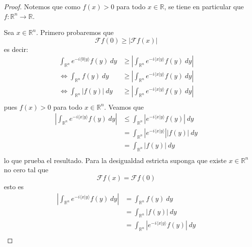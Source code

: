 \documentclass[12pt]{report}
\theoremstyle{largebreak}
\renewcommand{\leq}{\ensuremath{\leqslant}}
\renewcommand{\geq}{\ensuremath{\geqslant}}
\newcommand\abs[1]{\ensuremath{\left|#1\right|}}
\newcommand\cf[3]{\ensuremath{#1:#2\rightarrow#3}}
\newcommand\pint[2]{\ensuremath{\langle#1| #2\rangle}}
\newcommand{\fou}[1]{\ensuremath{\mathcal{F}#1}}
\begin{document}
    \begin{proof}
        Notemos que como $f(x)>0$ para todo $x\in\mathbb{R}$, se tiene en particular que $\cf{f}{\mathbb{R}^n}{\mathbb{R}}$.

        Sea $x\in\mathbb{R}^n$. Primero probaremos que
        \begin{equation*}
            \fou{f}(0)\geq\abs{\fou{f}(x)}
        \end{equation*}
        es decir:
        \begin{equation*}
            \begin{split}
                \int_{\mathbb{R}^n}e^{ -i\pint{0}{y}}f(y)\:dy&\geq\abs{\int_{\mathbb{R}^n}e^{ -i\pint{x}{y}}f(y)\:dy}\\
                \iff\int_{\mathbb{R}^n}f(y)\:dy&\geq\abs{\int_{\mathbb{R}^n}e^{ -i\pint{x}{y}}f(y)\:dy}\\
                \iff\int_{\mathbb{R}^n}\abs{f(y)}\:dy&\geq\abs{\int_{\mathbb{R}^n}e^{ -i\pint{x}{y}}f(y)\:dy}\\
            \end{split}
        \end{equation*}
        pues $f(x)>0$ para todo $x\in\mathbb{R}^n$. Veamos que
        \begin{equation}
            \begin{split}
                \abs{\int_{\mathbb{R}^n}e^{ -i\pint{x}{y}}f(y)\:dy}&\leq\int_{\mathbb{R}^n}\abs{e^{ -i\pint{x}{y}}f(y)}\:dy\\
                &=\int_{\mathbb{R}^n}\abs{e^{ -i\pint{x}{y}}}\abs{f(y)}\:dy\\
                &=\int_{\mathbb{R}^n}\abs{f(y)}\:dy\\
            \end{split}
        \end{equation}
        lo que prueba el resultado. Para la desigualdad estricta suponga que existe $x\in\mathbb{R}^n$ no cero tal que
        \begin{equation*}
            \fou{f}(x)=\fou{f}(0)
        \end{equation*}
        esto es
        \begin{equation*}
            \begin{split}
                \abs{\int_{\mathbb{R}^n}e^{ -i\pint{x}{y}}f(y)\:dy}&=\int_{\mathbb{R}^n}f(y)\:dy\\
                &=\int_{\mathbb{R}^n}\abs{f(y)}\:dy\\
                &=\int_{\mathbb{R}^n}\abs{e^{ -i\pint{x}{y}}f(y)}\:dy\\

\end{split}
\end{equation*}
\end{proof}
\end{document}
